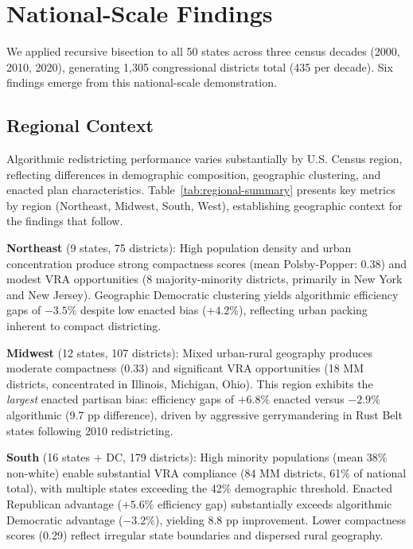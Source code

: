 \section{National-Scale Findings}

We applied recursive bisection to all 50 states across three census decades (2000, 2010, 2020), generating 1,305 congressional districts total (435 per decade). Six findings emerge from this national-scale demonstration.

\subsection{Regional Context}

Algorithmic redistricting performance varies substantially by U.S. Census region, reflecting differences in demographic composition, geographic clustering, and enacted plan characteristics. Table~\ref{tab:regional-summary} presents key metrics by region (Northeast, Midwest, South, West), establishing geographic context for the findings that follow.



\textbf{Northeast} (9 states, 75 districts): High population density and urban concentration produce strong compactness scores (mean Polsby-Popper: 0.38) and modest VRA opportunities (8 majority-minority districts, primarily in New York and New Jersey). Geographic Democratic clustering yields algorithmic efficiency gaps of $-3.5\%$ despite low enacted bias ($+4.2\%$), reflecting urban packing inherent to compact districting.

\textbf{Midwest} (12 states, 107 districts): Mixed urban-rural geography produces moderate compactness (0.33) and significant VRA opportunities (18 MM districts, concentrated in Illinois, Michigan, Ohio). This region exhibits the \emph{largest} enacted partisan bias: efficiency gaps of $+6.8\%$ enacted versus $-2.9\%$ algorithmic (9.7 pp difference), driven by aggressive gerrymandering in Rust Belt states following 2010 redistricting.

\textbf{South} (16 states + DC, 179 districts): High minority populations (mean 38\% non-white) enable substantial VRA compliance (84 MM districts, 61\% of national total), with multiple states exceeding the 42\% demographic threshold. Enacted Republican advantage ($+5.6\%$ efficiency gap) substantially exceeds algorithmic Democratic advantage ($-3.2\%$), yielding 8.8 pp improvement. Lower compactness scores (0.29) reflect irregular state boundaries and dispersed rural geography.

